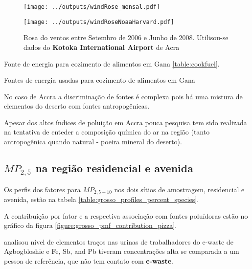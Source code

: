 \begin{figure}[H]
  \centering
  \texttt{[image: ../outputs/windRose\_mensal.pdf]}
  \caption{ \citep{carslaw2012} \label{fig:windRose_mensal}}
\end{figure}


\begin{figure}[H]
  \centering
  \texttt{[image: ../outputs/windRoseNoaaHarvard.pdf]}
  \caption{Rosa do ventos entre
           Setembro de 2006 e Junho de 2008. Utilisou-se dados 
           do \textbf{Kotoka International Airport} de Acra \label{fg:rosaCompleta}}
\end{figure}

Fonte de energia para cozimento de alimentos em Gana \ref{table:cookfuel}.
\begin{table}[H]
 \centering
  
  \caption{Fontes de energia usadas para cozimento de alimentos em 
           Gana \citep{ghanacensus2013} \label{table:cookfuel}}
\end{table}

No caso de Accra a discriminação de fontes é complexa pois
há uma mistura de elementos do deserto com fontes antropogênicas.

Apesar dos altos índices de poluição em Accra pouca pesquisa tem sido 
realizada na tentativa de enteder a composição química do ar na região
(tanto antropogênica quando natural - poeira mineral do deserto). 

\subsection{$MP_{2,5}$ na região residencial e avenida}

Os perfis dos fatores para $MP_{2,5-10}$ nos dois sítios de amostragem, 
residencial e avenida, estão na tabela \ref{table:grosso_profiles_percent_species}.

A contribuição por fator e a respectiva associação com fontes poluídoras
estão no gráfico da figura \ref{figure:grosso_pmf_contribution_pizza}. 

\citep{asante2012} analisou nível de elementos traços nas urinas de trabalhadores 
do e-waste de Agbogbloshie e Fe, Sb, and Pb tiveram concentrações alta se comparada
a um pessoa de referência, que não tem contato com \textbf{e-waste}.


